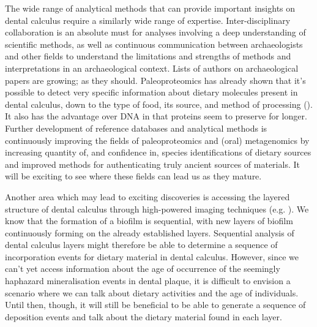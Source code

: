 \documentclass[
  b5paper,
]{book}
\begin{document}
The wide range of analytical methods that can provide important insights
on dental calculus require a similarly wide range of expertise.
Inter-disciplinary collaboration is an absolute must for analyses
involving a deep understanding of scientific methods, as well as
continuous communication between archaeologists and other fields to
understand the limitations and strengths of methods and interpretations
in an archaeological context. Lists of authors on archaeological papers
are growing; as they should. Paleoproteomics has already shown that it's
possible to detect very specific information about dietary molecules
present in dental calculus, down to the type of food, its source, and
method of processing (). It also has the advantage over DNA in that proteins seem to
preserve for longer. Further development of reference databases and
analytical methods is continuously improving the fields of
paleoproteomics and (oral) metagenomics by increasing quantity of, and
confidence in, species identifications of dietary sources and improved
methods for authenticating truly ancient sources of materials. It will
be exciting to see where these fields can lead us as they mature.

Another area which may lead to exciting discoveries is accessing the
layered structure of dental calculus through high-powered imaging
techniques (e.g.
). We know that the formation of a biofilm is sequential, with
new layers of biofilm continuously forming on the already established
layers. Sequential analysis of dental calculus layers might therefore be
able to determine a sequence of incorporation events for dietary
material in dental calculus. However, since we can't yet access
information about the age of occurrence of the seemingly haphazard
mineralisation events in dental plaque, it is difficult to envision a
scenario where we can talk about dietary activities and the age of
individuals. Until then, though, it will still be beneficial to be able
to generate a sequence of deposition events and talk about the dietary
material found in each layer.
\end{document}
